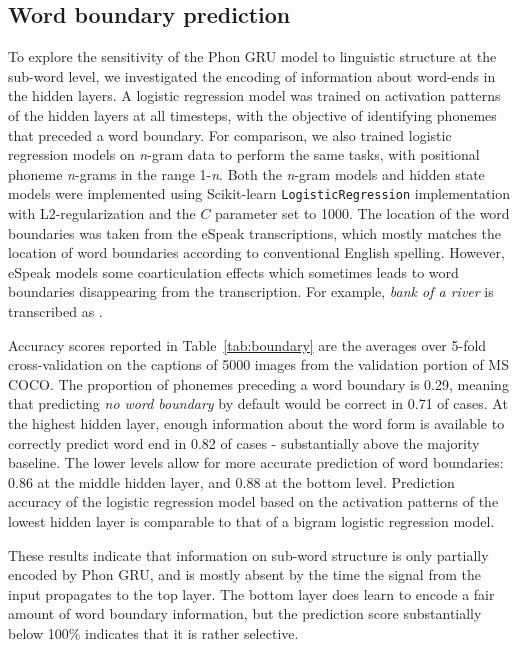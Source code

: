 
\subsection{Word boundary prediction}
To explore the sensitivity of the {\sc Phon GRU} model to linguistic structure at the sub-word level, we investigated the encoding of information about word-ends in the hidden layers. A logistic regression model was trained on activation patterns of the hidden layers at all timesteps, with the objective of identifying phonemes that preceded a word boundary. For comparison, we also trained logistic regression models on \textit{n}-gram data to perform the same tasks, with positional phoneme \textit{n}-grams in the range 1-\textit{n}. Both the \textit{n}-gram models and hidden state models were implemented using Scikit-learn \cite{scikit-learn} {\tt LogisticRegression} implementation with L2-regularization and the $C$ parameter set to 1000. The location of the word boundaries was taken from the eSpeak transcriptions, which mostly matches the location of word boundaries according to conventional English spelling. However, eSpeak models some coarticulation effects which sometimes leads to word boundaries disappearing from the transcription. For example, {\it bank of a river} is transcribed as .

Accuracy scores reported in Table~\ref{tab:boundary} are the averages over 5-fold cross-validation on the captions of 5000 images from the validation portion of MS COCO. The proportion of phonemes preceding a word boundary is 0.29, meaning that predicting {\it no word boundary} by default would be correct in 0.71 of cases. At the highest hidden layer, enough information about the word form is available to correctly predict word end in 0.82 of cases - substantially above the majority baseline. The lower levels allow for more accurate prediction of word boundaries: 0.86 at the middle hidden layer, and 0.88 at the bottom level. 
Prediction accuracy of the logistic regression model based on the activation patterns of the lowest hidden layer is comparable to that of a bigram logistic regression model.

These results indicate that information on sub-word structure is only partially encoded by {\sc Phon GRU}, and is mostly absent by the time the signal from the input propagates to the top layer. The bottom layer does learn to encode a fair amount of word boundary information, but the prediction score substantially below 100\% indicates that it is rather selective. 

